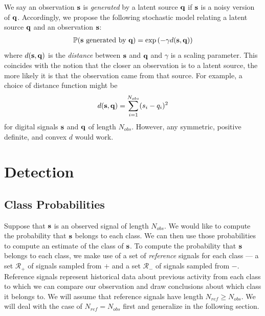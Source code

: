We say an observation $\mathbf s$ is {\em generated} by a latent source $\mathbf q$ if $\mathbf s$
is a noisy version of $\mathbf q$. Accordingly, we propose the following stochastic
model relating a latent source $\mathbf q$ and an observation $\mathbf s$:
\begin{gather}
\mathbb{P}(\mathbf s \text{ generated by } \mathbf q) = \exp\left(-\gamma d(\mathbf s,\mathbf q) \right)
\end{gather}
where $d(\mathbf s, \mathbf q)$ is the {\em distance} between $\mathbf s$ and $\mathbf q$ and $\gamma$ is a
scaling parameter. This coincides with the notion that the closer an observation
is to a latent source, the more likely it is that the observation came from that
source. For example, a choice of distance function might be
\begin{gather}
d(\mathbf s,\mathbf q) = \sum_{i=1}^{N_{obs}} (s_i - q_i)^2
\end{gather}
for digital signals $\mathbf s$ and $\mathbf q$ of length $N_{obs}$. However, any
symmetric, positive definite, and convex $d$ would work.

\section{Detection}
\subsection{Class Probabilities}
Suppose that $\mathbf s$ is an observed signal of length $N_{obs}$. We would like to
compute the probability that $\mathbf s$ belongs to each class. We can then use
those probabilities to compute an estimate of the class of $\mathbf s$.  To compute
the probability that $\mathbf s$ belongs to each class, we make use of a set of {\em
  reference} signals for each class --- a set $\mathcal{R}_+$ of signals sampled
from $+$ and a set $\mathcal{R}_-$ of signals sampled from $-$. Reference
signals represent historical data about previous activity from each class to
which we can compare our observation and draw conclusions about which class it
belongs to. We will assume that reference signals have length $N_{ref} \geq
N_{obs}$. We will deal with the case of $N_{ref} = N_{obs}$ first and generalize
in the following section.

